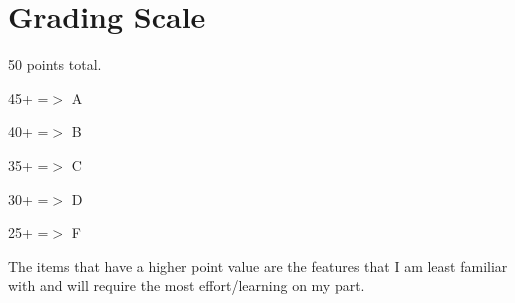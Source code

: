 \documentclass[11pt]{article}
\begin{document}
    \section{Grading Scale}

        50 points total.

        45+ =$>$ A

        40+ =$>$ B

        35+ =$>$ C

        30+ =$>$ D

        25+ =$>$ F

        The items that have a higher point value are the features that I am least familiar with and will require the most effort/learning on my part.
\end{document}
